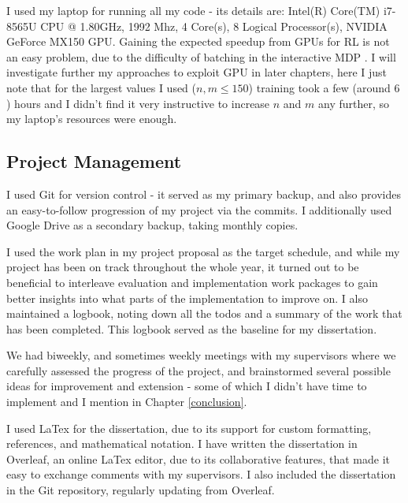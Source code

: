 I used my laptop for running all my code - its details are: Intel(R) Core(TM) i7-8565U CPU @ 1.80GHz, 1992 Mhz, 4 Core(s), 8 Logical Processor(s), NVIDIA GeForce MX150 GPU. Gaining the expected speedup from GPUs for RL is not an easy problem, due to the difficulty of batching in the interactive MDP \cite{stooke2018gpudeepRL}. I will investigate further my approaches to exploit GPU in later chapters, here I just note that for the largest values I used ($n,m\leq 150$) training took a few (around $6$) hours and I didn't find it very instructive to increase $n$ and $m$ any further, so my laptop's resources were enough.


\subsection{Project Management}


I used Git for version control - it served as my primary backup, and also provides an easy-to-follow progression of my project via the commits. I additionally used Google Drive as a secondary backup, taking monthly copies. 

I used the work plan in my project proposal as the target schedule, and while my project has been on track throughout the whole year, it turned out to be beneficial to interleave evaluation and implementation work packages to gain better insights into what parts of the implementation to improve on. I also maintained a logbook, noting down all the todos and a summary of the work that has been completed. This logbook served as the baseline for my dissertation.

We had biweekly, and sometimes weekly meetings with my supervisors where we carefully assessed the progress of the project, and brainstormed several possible ideas for improvement and extension - some of which I didn't have time to implement and I mention in Chapter \ref{conclusion}.

I used LaTex for the dissertation, due to its support for custom formatting, references, and mathematical notation. I have written the dissertation in Overleaf, an online LaTex editor, due to its collaborative features, that made it easy to exchange comments with my supervisors. I also included the dissertation in the Git repository, regularly updating from Overleaf.



